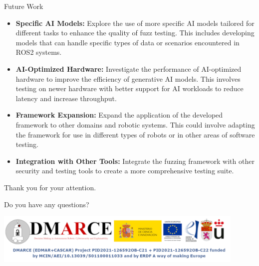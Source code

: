 \documentclass[aspectratio=169]{beamer}
\begin{document}
\begin{frame}{Future Work}
\begin{tcolorbox}[drop shadow southeast, enhanced, colback=blue!5!white, colframe=Azuloscuro-cisis]
\begin{itemize}
    \begin{itemize}
        \item \textbf{Specific AI Models:} Explore the use of more specific AI models tailored for different tasks to enhance the quality of fuzz testing. This includes developing models that can handle specific types of data or scenarios encountered in ROS2 systems.
        \item \textbf{AI-Optimized Hardware:} Investigate the performance of AI-optimized hardware to improve the efficiency of generative AI models. This involves testing on newer hardware with better support for AI workloads to reduce latency and increase throughput.
        \item \textbf{Framework Expansion:} Expand the application of the developed framework to other domains and robotic systems. This could involve adapting the framework for use in different types of robots or in other areas of software testing.
        \item \textbf{Integration with Other Tools:} Integrate the fuzzing framework with other security and testing tools to create a more comprehensive testing suite.
    \end{itemize}
\end{itemize}
\end{tcolorbox}
\end{frame}



\begin{frame}
\begin{center}
{\centering\Huge\textcolor{black!50}{Thank you for your attention.}\par Do you have any questions?}%

\includegraphics[width=0.9\textwidth]{./img/mecenas_logos.png}

\end{center}
    
\end{frame}


%
%
%    
%    
%
\end{document}
